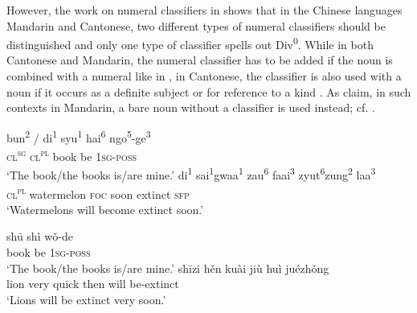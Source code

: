 \documentclass[output=paper,colorlinks,citecolor=brown]{langscibook}
\begin{document}
However, the work on numeral classifiers in \citet{ChengSybesma2014} shows that in the Chinese languages Mandarin and Cantonese, two different types of numeral classifiers should be distinguished and only one type of classifier spells out Div\textsuperscript{0}. While in both Cantonese and Mandarin, the numeral classifier has to be added if the noun is combined with a numeral like in , in Cantonese, the classifier is also used with a noun if it occurs as a definite subject  or for reference to a kind . As \citet{ChengSybesma2014} claim, in such contexts in Mandarin, a bare noun without a classifier is used instead; cf. .

\ea\label{ex:geist:3}
\ea
\gll bun\textsuperscript{2} / di\textsuperscript{1} syu\textsuperscript{1}  hai\textsuperscript{6}   ngo\textsuperscript{5}-ge\textsuperscript{3} \\
\textsc{cl}\textsuperscript{\textsc{sg}} {} \textsc{cl}\textsuperscript{\textsc{pl}} book be \textsc{1sg-poss} \\ 
\glt `The book/the books is/are mine.'
\label{ex:geist:3a}
\ex 
\gll di\textsuperscript{1} sai\textsuperscript{1}gwaa\textsuperscript{1} zau\textsuperscript{6} faai\textsuperscript{3} zyut\textsuperscript{6}zung\textsuperscript{2} laa\textsuperscript{3}\\
\textsc{cl}\textsuperscript{\textsc{pl}} watermelon \textsc{foc} soon extinct \textsc{sfp}\\
\glt `Watermelons will become extinct soon.’
\\ \hfill \citep[Cantonese;][253f.]{ChengSybesma2014}
\label{ex:geist:3b}
\z\z
  
\ea\label{ex:geist:4}
\ea
\gll shū shì wǒ-de \\
book be \textsc{1sg-poss} \\ 
\glt `The book/the books is/are mine.'
\label{ex:geist:4a}
\ex
\gll shīzi hěn kuài jiù huì juézhǒng \\
lion very quick then will be-extinct \\
\glt `Lions will be extinct very soon.' \\\hfill \citep[Mandarin;][252]{ChengSybesma2014}
\label{ex:geist:4b}
\z\z
\end{document}
